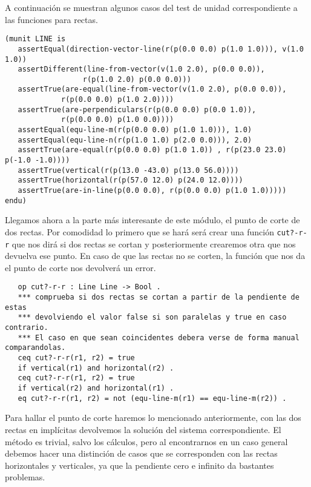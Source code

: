 A continuación se muestran algunos casos del test de unidad correspondiente a las funciones para rectas. \par

{\codesize
\begin{verbatim}
(munit LINE is
   assertEqual(direction-vector-line(r(p(0.0 0.0) p(1.0 1.0))), v(1.0 1.0))	
   assertDifferent(line-from-vector(v(1.0 2.0), p(0.0 0.0)),
                  r(p(1.0 2.0) p(0.0 0.0)))
   assertTrue(are-equal(line-from-vector(v(1.0 2.0), p(0.0 0.0)),
             r(p(0.0 0.0) p(1.0 2.0))))
   assertTrue(are-perpendiculars(r(p(0.0 0.0) p(0.0 1.0)),
             r(p(0.0 0.0) p(1.0 0.0))))
   assertEqual(equ-line-m(r(p(0.0 0.0) p(1.0 1.0))), 1.0)
   assertEqual(equ-line-n(r(p(1.0 1.0) p(2.0 0.0))), 2.0)
   assertTrue(are-equal(r(p(0.0 0.0) p(1.0 1.0)) , r(p(23.0 23.0) p(-1.0 -1.0))))
   assertTrue(vertical(r(p(13.0 -43.0) p(13.0 56.0))))
   assertTrue(horizontal(r(p(57.0 12.0) p(24.0 12.0))))
   assertTrue(are-in-line(p(0.0 0.0), r(p(0.0 0.0) p(1.0 1.0)))))
endu)
\end{verbatim}
}

Llegamos ahora a la parte más interesante de este módulo, el punto de corte de dos rectas.
Por comodidad lo primero que se hará será crear una función \texttt{cut?-r-r} que nos dirá si dos rectas se cortan y
posteriormente crearemos otra que nos devuelva ese punto. En caso de que las rectas no se corten, la función que nos da el punto de corte nos devolverá un error. \par

{\codesize
\begin{verbatim}	
   op cut?-r-r : Line Line -> Bool .
   *** comprueba si dos rectas se cortan a partir de la pendiente de estas
   *** devolviendo el valor false si son paralelas y true en caso contrario.
   *** El caso en que sean coincidentes debera verse de forma manual comparandolas.
   ceq cut?-r-r(r1, r2) = true 
   if vertical(r1) and horizontal(r2) .
   ceq cut?-r-r(r1, r2) = true 
   if vertical(r2) and horizontal(r1) .
   eq cut?-r-r(r1, r2) = not (equ-line-m(r1) == equ-line-m(r2)) .
\end{verbatim}
}

Para hallar el punto de corte haremos lo mencionado anteriormente, con las dos rectas en implícitas devolvemos la solución del sistema correspondiente. El método es trivial, salvo los cálculos, pero al encontrarnos en un caso general debemos hacer una distinción de casos que se corresponden con las rectas horizontales y verticales, ya que la pendiente cero e infinito da bastantes problemas. \par

